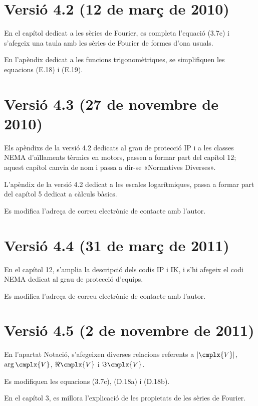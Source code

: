 \section*{Versió 4.2 (12 de març de 2010)}
En el capítol dedicat a les sèries de Fourier, es completa l'equació (3.7c) i s'afegeix una taula amb les sèries de Fourier de formes d'ona usuals.

En l'apèndix dedicat a les funcions trigonomètriques, se simplifiquen les equacions (E.18) i (E.19).

\section*{Versió 4.3 (27 de novembre de 2010)}
Els apèndixs de la versió 4.2 dedicats al grau de protecció IP i  a les classes NEMA d'aïllaments tèrmics en motors, passen a formar part del capítol 12; aquest capítol canvia de nom i passa a dir-se «Normatives Diverses».

L'apèndix de la versió 4.2 dedicat a les escales logarítmiques, passa a formar part del capítol 5 dedicat a càlculs bàsics.

Es modifica l'adreça de correu electrònic de contacte amb l'autor.

\section*{Versió 4.4 (31 de març de 2011)}
En el capítol 12, s'amplia la descripció dels codis IP i IK, i s'hi afegeix el codi NEMA dedicat al grau de protecció d'equips.

Es modifica l'adreça de correu electrònic de contacte amb l'autor.

\section*{Versió 4.5 (2 de novembre de 2011)}
En l'apartat Notació, s'afegeixen diverses relacions referents a $|\cmplx{V}|$, $\arg\cmplx{V}$, $\Re\cmplx{V}$ i $\Im\cmplx{V}$.

Es modifiquen les equacions (3.7c), (D.18a) i (D.18b).

En el capítol 3, es millora l'explicació de les propietats de les sèries de Fourier.

